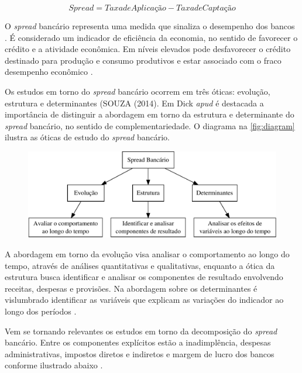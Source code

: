 \documentclass[12pt,openright,oneside,a4paper,chapter=TITLE,section=TITLE,subsection=TITLE,english,french,spanish,portugues,sumario=tradicional]{04-class-files/abntex2}
\begin{document}
\[
Spread = Taxa de Aplicação - Taxa de Captação
\]

O \emph{spread} bancário representa uma medida que sinaliza o desempenho dos bancos
\cite{levine:1997}. É considerado um indicador de eficiência da economia, no
sentido de favorecer o crédito e a atividade econômica. Em níveis elevados pode
desfavorecer o crédito destinado para produção e consumo produtivos e estar
associado com o fraco desempenho econômico \cite{WB:2005}.

Os estudos em torno do \emph{spread} bancário ocorrem em três óticas: evolução,
estrutura e determinantes (SOUZA (2014). Em Dick \emph{apud} \cite{leal:2006} é
destacada a importância de distinguir a abordagem em torno da estrutura e
determinante do \emph{spread} bancário, no sentido de complementariedade. O diagrama
na \autoref{fig:diagram} ilustra as óticas de estudo do \emph{spread} bancário.

\begin{figure}

\begin{center}\includegraphics{12-exportedfigures/diagram.spread-1} \end{center}
\label{fig:diagram}
\end{figure}

A abordagem em torno da evolução visa analisar o comportamento ao longo do
tempo, através de análises quantitativas e qualitativas, enquanto a ótica da
estrutura busca identificar e analisar os componentes de resultado envolvendo
receitas, despesas e provisões. Na abordagem sobre os determinantes é
vislumbrado identificar as variáveis que explicam as variações do indicador ao
longo dos períodos \cite{leal:2006}.

Vem se tornando relevantes os estudos em torno da decomposição do \emph{spread}
bancário. Entre os componentes explícitos estão a inadimplência, despesas
administrativas, impostos diretos e indiretos e margem de lucro dos bancos
conforme ilustrado abaixo \cite{BCB:2000}.
\end{document}
